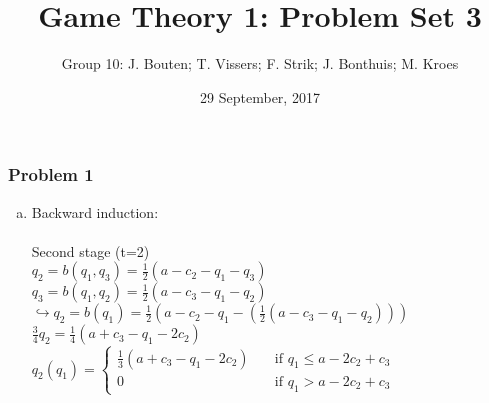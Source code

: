 \documentclass[a4paper]{article}
\author{Group 10: J. Bouten; T. Vissers; F. Strik; J. Bonthuis; M. Kroes}
\date{29 September, 2017}
\title{Game Theory 1: Problem Set 3}
\begin{document}
\maketitle
\subsubsection{Problem 1}
\begin{enumerate}[(a)]
\item
Backward induction: \\ \\
Second stage (t=2)\\

$q_2=b(q_1,q_3)=\frac{1}{2}(a-c_2-q_1-q_3)$\\
$q_3=b(q_1,q_2)=\frac{1}{2}(a-c_3-q_1-q_2)$\\

$\hookrightarrow q_2=b(q_1)=\frac{1}{2}(a-c_2-q_1-(\frac{1}{2}(a-c_3-q_1-q_2)))$\\
$\frac{3}{4}q_2=\frac{1}{4}(a+c_3-q_1-2c_2)$\\

$q_2(q_1)=\begin{cases}
\frac{1}{3}(a+c_3-q_1-2c_2) & \quad \text{if }
q_1 \le a-2c_2+c_3\\
0 & \quad \text{if } q_1>a-2c_2+c_3
\end{cases}
$
\\ 


\end{enumerate}
\end{document}
